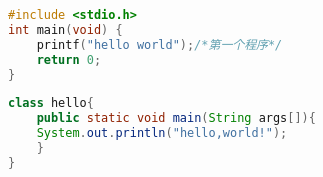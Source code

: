 \begin{appendix}
	
\begin{lstlisting}[language=c]
#include <stdio.h>
int main(void) {
    printf("hello world");/*第一个程序*/
    return 0;
}
\end{lstlisting}
\begin{lstlisting}[language=java]
class hello{
	public static void main(String args[]){
	System.out.println("hello,world!");
	}
}
\end{lstlisting}
\end{appendix}